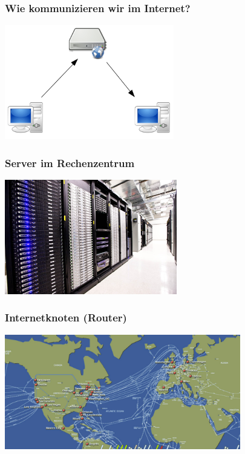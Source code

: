 \documentclass[12pt]{beamer}
\begin{document}
\begin{frame}
    \frametitle{Wie kommunizieren wir im Internet?}
    \begin{center}
      \includegraphics[height=5cm]{img/c-s.png}
    \end{center}
\end{frame}

\begin{frame}
    \frametitle{Server im Rechenzentrum}
    \begin{center}
      \includegraphics[height=5cm]{img/data_center.jpg}
    \end{center}
\end{frame}

\begin{frame}
    \frametitle{Internetknoten (Router)}
    \begin{center}
      \includegraphics[height=5cm]{img/internet_cable_map.png}
    \end{center}
\end{frame}
\end{document}

